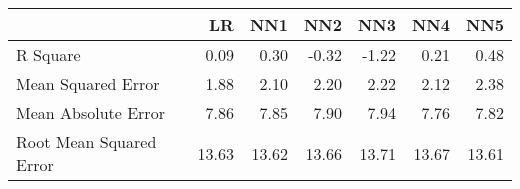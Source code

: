 \begin{tabular}{lrrrrrr}
\toprule
{} &     LR &    NN1 &    NN2 &    NN3 &    NN4 &    NN5 \\
\midrule
R Square                &   0.09 &   0.30 &  -0.32 &  -1.22 &   0.21 &   0.48 \\
Mean Squared Error      &   1.88 &   2.10 &   2.20 &   2.22 &   2.12 &   2.38 \\
Mean Absolute Error     &   7.86 &   7.85 &   7.90 &   7.94 &   7.76 &   7.82 \\
Root Mean Squared Error &  13.63 &  13.62 &  13.66 &  13.71 &  13.67 &  13.61 \\
\bottomrule
\end{tabular}

